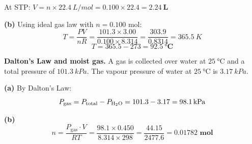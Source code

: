 \documentclass[addpoints]{exam}
\begin{document}
\begin{questions}
\begin{solution}[9cm]
At STP: $V = n \times \SI{22.4}{L/mol} = 0.100 \times 22.4 = \mathbf{\SI{2.24}{L}}$

\textbf{(b)} Using ideal gas law with $n = 0.100$ mol:
\[
T = \frac{PV}{nR} = \frac{101.3 \times 3.00}{0.100 \times 8.314}
= \frac{303.9}{0.8314} = \SI{365.5}{K}
\]
\[
T = 365.5 - 273 = \mathbf{\SI{92.5}{\celsius}}
\]
\end{solution}

\question \textbf{Dalton's Law and moist gas.} A gas is collected over water at
$\SI{25}{\celsius}$ and a total pressure of $\SI{101.3}{kPa}$. The vapour pressure of
water at $\SI{25}{\celsius}$ is $\SI{3.17}{kPa}$.
\begin{solution}[7cm]
\textbf{(a)} By Dalton's Law:
\[
P_\text{gas} = P_\text{total} - P_{\ce{H2O}} = 101.3 - 3.17 = \mathbf{\SI{98.1}{kPa}}
\]

\textbf{(b)}
\[
n = \frac{P_\text{gas} \cdot V}{RT} = \frac{98.1 \times 0.450}{8.314 \times 298}
= \frac{44.15}{2477.6} = \mathbf{0.01782 \text{ mol}}
\]
\end{solution}

\end{questions}
\end{document}
